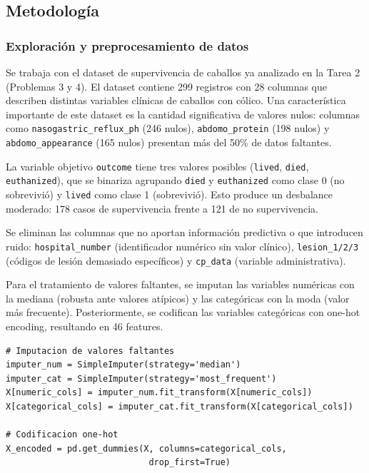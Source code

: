 \documentclass{article}
\begin{document}
\subsection{Metodología}

\subsubsection{Exploración y preprocesamiento de datos}

Se trabaja con el dataset de supervivencia de caballos ya analizado en la Tarea 2 (Problemas 3 y 4). El dataset contiene 299 registros con 28 columnas que describen distintas variables clínicas de caballos con cólico. Una característica importante de este dataset es la cantidad significativa de valores nulos: columnas como \texttt{nasogastric\_reflux\_ph} (246 nulos), \texttt{abdomo\_protein} (198 nulos) y \texttt{abdomo\_appearance} (165 nulos) presentan más del 50\% de datos faltantes.

La variable objetivo \texttt{outcome} tiene tres valores posibles (\texttt{lived}, \texttt{died}, \texttt{euthanized}), que se binariza agrupando \texttt{died} y \texttt{euthanized} como clase 0 (no sobrevivió) y \texttt{lived} como clase 1 (sobrevivió). Esto produce un desbalance moderado: 178 casos de supervivencia frente a 121 de no supervivencia.

Se eliminan las columnas que no aportan información predictiva o que introducen ruido: \texttt{hospital\_number} (identificador numérico sin valor clínico), \texttt{lesion\_1/2/3} (códigos de lesión demasiado específicos) y \texttt{cp\_data} (variable administrativa).

Para el tratamiento de valores faltantes, se imputan las variables numéricas con la mediana (robusta ante valores atípicos) y las categóricas con la moda (valor más frecuente). Posteriormente, se codifican las variables categóricas con one-hot encoding, resultando en 46 features.

\begin{lstlisting}
# Imputacion de valores faltantes
imputer_num = SimpleImputer(strategy='median')
imputer_cat = SimpleImputer(strategy='most_frequent')
X[numeric_cols] = imputer_num.fit_transform(X[numeric_cols])
X[categorical_cols] = imputer_cat.fit_transform(X[categorical_cols])

# Codificacion one-hot
X_encoded = pd.get_dummies(X, columns=categorical_cols, 
                            drop_first=True)
\end{lstlisting}
\end{document}
